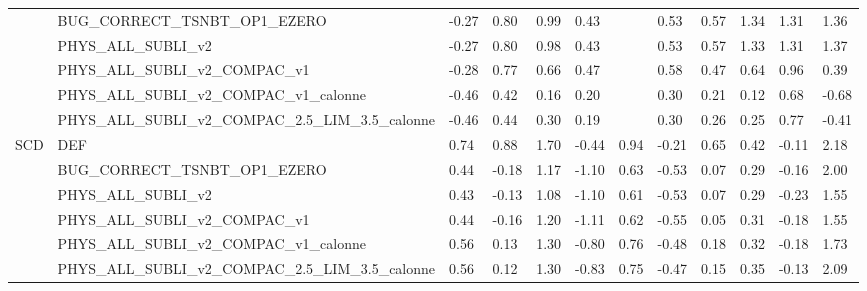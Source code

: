 \begin{tabular}{llllllllllll}
 & BUG_CORRECT_TSNBT_OP1_EZERO & -0.27 & 0.80 & 0.99 & 0.43 &  & 0.53 & 0.57 & 1.34 & 1.31 & 1.36 \\
 & PHYS_ALL_SUBLI_v2 & -0.27 & 0.80 & 0.98 & 0.43 &  & 0.53 & 0.57 & 1.33 & 1.31 & 1.37 \\
 & PHYS_ALL_SUBLI_v2_COMPAC_v1 & -0.28 & 0.77 & 0.66 & 0.47 &  & 0.58 & 0.47 & 0.64 & 0.96 & 0.39 \\
 & PHYS_ALL_SUBLI_v2_COMPAC_v1_calonne & -0.46 & 0.42 & 0.16 & 0.20 &  & 0.30 & 0.21 & 0.12 & 0.68 & -0.68 \\
 & PHYS_ALL_SUBLI_v2_COMPAC_2.5_LIM_3.5_calonne & -0.46 & 0.44 & 0.30 & 0.19 &  & 0.30 & 0.26 & 0.25 & 0.77 & -0.41 \\
\cline{1-12}
\multirow[t]{6}{*}{SCD} & DEF & 0.74 & 0.88 & 1.70 & -0.44 & 0.94 & -0.21 & 0.65 & 0.42 & -0.11 & 2.18 \\
 & BUG_CORRECT_TSNBT_OP1_EZERO & 0.44 & -0.18 & 1.17 & -1.10 & 0.63 & -0.53 & 0.07 & 0.29 & -0.16 & 2.00 \\
 & PHYS_ALL_SUBLI_v2 & 0.43 & -0.13 & 1.08 & -1.10 & 0.61 & -0.53 & 0.07 & 0.29 & -0.23 & 1.55 \\
 & PHYS_ALL_SUBLI_v2_COMPAC_v1 & 0.44 & -0.16 & 1.20 & -1.11 & 0.62 & -0.55 & 0.05 & 0.31 & -0.18 & 1.55 \\
 & PHYS_ALL_SUBLI_v2_COMPAC_v1_calonne & 0.56 & 0.13 & 1.30 & -0.80 & 0.76 & -0.48 & 0.18 & 0.32 & -0.18 & 1.73 \\
 & PHYS_ALL_SUBLI_v2_COMPAC_2.5_LIM_3.5_calonne & 0.56 & 0.12 & 1.30 & -0.83 & 0.75 & -0.47 & 0.15 & 0.35 & -0.13 & 2.09 \\
\cline{1-12}
\bottomrule
\end{tabular}
